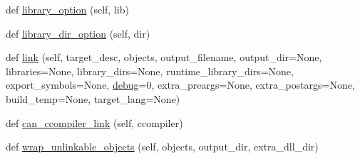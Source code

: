 \begin{DoxyCompactItemize}
\item 
def \hyperlink{classnumpy_1_1distutils_1_1fcompiler_1_1FCompiler_a112ff3629e683da8a963d684a5e99c14}{library\+\_\+option} (self, lib)
\item 
def \hyperlink{classnumpy_1_1distutils_1_1fcompiler_1_1FCompiler_a64d6046abfefe0075824af329fb810b6}{library\+\_\+dir\+\_\+option} (self, dir)
\item 
def \hyperlink{classnumpy_1_1distutils_1_1fcompiler_1_1FCompiler_ad8ac588e88b603ca48db79565dc9f8b6}{link} (self, target\+\_\+desc, objects, output\+\_\+filename, output\+\_\+dir=None, libraries=None, library\+\_\+dirs=None, runtime\+\_\+library\+\_\+dirs=None, export\+\_\+symbols=None, \hyperlink{classnumpy_1_1distutils_1_1fcompiler_1_1FCompiler_a7ca30a0f689d360050c93c6d277966c4}{debug}=0, extra\+\_\+preargs=None, extra\+\_\+postargs=None, build\+\_\+temp=None, target\+\_\+lang=None)
\item 
def \hyperlink{classnumpy_1_1distutils_1_1fcompiler_1_1FCompiler_af26c44262aeab69dac8138d34f928339}{can\+\_\+ccompiler\+\_\+link} (self, ccompiler)
\item 
def \hyperlink{classnumpy_1_1distutils_1_1fcompiler_1_1FCompiler_a5420e554458a9c84feaf633919c39890}{wrap\+\_\+unlinkable\+\_\+objects} (self, objects, output\+\_\+dir, extra\+\_\+dll\+\_\+dir)
\end{DoxyCompactItemize}
